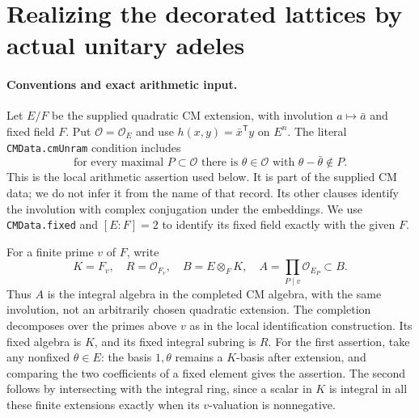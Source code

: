 \section{Realizing the decorated lattices by actual unitary adeles}
\label{sec:decorated-realization}


\paragraph{Conventions and exact arithmetic input.}
Let $E/F$ be the supplied quadratic CM extension, with involution
$a\mapsto\bar a$ and fixed field $F$. Put $\mathcal O=\mathcal O_E$
and use $h(x,y)=\bar x^{\mathsf T}y$ on $E^n$.
The literal \texttt{CMData.cmUnram} condition includes
\[
 \text{for every maximal }P\subset\mathcal O\text{ there is }
 \theta\in\mathcal O\text{ with }\theta-\bar\theta\notin P.
 \tag{DR.1}
\]
This is the local arithmetic assertion used below. It is part of the
supplied CM data; we do not infer it from the name of that record.
Its other clauses identify the involution with complex conjugation
under the embeddings. We use \texttt{CMData.fixed} and
$[E:F]=2$ to identify its fixed field exactly with the given $F$.

For a finite prime $v$ of $F$, write
\[
 K=F_v,\quad R=\mathcal O_{F_v},\quad
 B=E\otimes_F K,\quad
 A=\prod_{P\mid v}\mathcal O_{E_P}\subset B.
 \tag{DR.2}
\]
Thus $A$ is the integral algebra in the completed CM algebra, with
the same involution, not an arbitrarily chosen quadratic extension.
The completion decomposes over the primes above $v$ as in the local
identification construction. Its fixed algebra is $K$, and its fixed
integral subring is $R$. For the first assertion, take any nonfixed
$\theta\in E$: the basis $1,\theta$ remains a $K$-basis after
extension, and comparing the two coefficients of a fixed element
gives the assertion. The second follows by intersecting with the
integral ring, since a scalar in $K$ is integral in all these finite
extensions exactly when its $v$-valuation is nonnegative.


